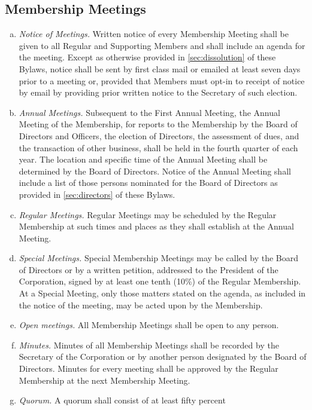 \subsection{Membership Meetings}
\begin{enumerate}[a.]
\item \emph{Notice of Meetings.}  Written notice of every Membership
  Meeting shall be given to all Regular and Supporting Members and
  shall include an agenda for the meeting. Except as otherwise
  provided in \ref{sec:dissolution} of these Bylaws, notice shall be
  sent by first class mail or emailed at least seven days prior to a
  meeting or, provided that Members must opt-in to receipt of notice
  by email by providing prior written notice to the Secretary of such
  election.
\item \emph{Annual Meetings.}  Subsequent to the First Annual Meeting,
  the Annual Meeting of the Membership, for reports to the Membership
  by the Board of Directors and Officers, the election of Directors,
  the assessment of dues, and the transaction of other business, shall
  be held in the fourth quarter of each year. The location and
  specific time of the Annual Meeting shall be determined by the Board
  of Directors. Notice of the Annual Meeting shall include a list of
  those persons nominated for the Board of Directors as provided in
  \ref{sec:directors} of these Bylaws.
\item \emph{Regular Meetings.}  Regular Meetings may be scheduled by
  the Regular Membership at such times and places as they shall
  establish at the Annual Meeting.
\item \emph{Special Meetings.}  Special Membership Meetings may be
  called by the Board of Directors or by a written petition, addressed
  to the President of the Corporation, signed by at least one tenth
  (10\%) of the Regular Membership. At a Special Meeting, only those
  matters stated on the agenda, as included in the notice of the
  meeting, may be acted upon by the Membership.
\item \emph{Open meetings.}  All Membership Meetings shall be open to
  any person.
\item \emph{Minutes.}  Minutes of all Membership Meetings shall be
  recorded by the Secretary of the Corporation or by another person
  designated by the Board of Directors. Minutes for every meeting
  shall be approved by the Regular Membership at the next Membership
  Meeting.
\item \emph{Quorum.}  A quorum shall consist of at least fifty percent

\end{enumerate}
